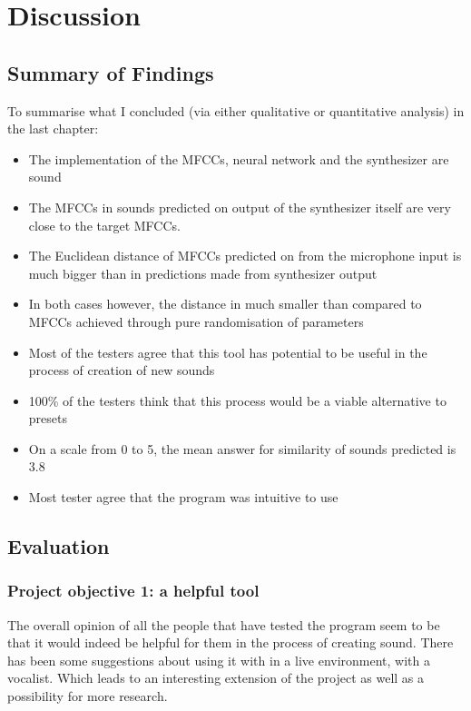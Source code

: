 \chapter{Discussion}
\label{chapterlabel5}

\section{Summary of Findings}
To summarise what I concluded (via either qualitative or quantitative
analysis) in the last chapter:
\begin{itemize}
\item The implementation of the MFCCs, neural network and the synthesizer are sound
\item The MFCCs in sounds predicted on output of the synthesizer
    itself are very close to the target MFCCs.
\item The Euclidean distance of MFCCs predicted on from the microphone
  input is much bigger than in predictions made from synthesizer output 
\item In both cases however, the distance in much smaller than
  compared to MFCCs achieved through pure randomisation of parameters
\item Most of the testers agree that this tool has potential to be
  useful in the process of creation of new sounds  
\item 100\% of the testers think that this process would be a viable
  alternative to presets
\item On a scale from 0 to 5, the mean answer for similarity of sounds
  predicted is 3.8
\item Most tester agree that the program was intuitive to use
\end{itemize}

\section{Evaluation}
\subsection{Project objective 1: a helpful tool}

The overall opinion of all the people that have tested the program
seem to be that it would indeed be helpful for them in the process of
creating sound. There has been some suggestions about using it with in
a live environment, with a vocalist. Which leads to an interesting
extension of the project as well as a possibility for more research.

